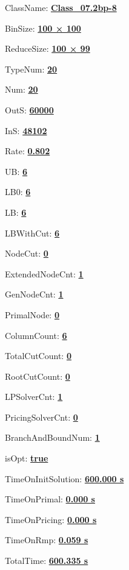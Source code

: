 \documentclass[11pt]{article}
\begin{document}
\pagestyle{empty}


ClassName: \underline{\textbf{Class_07.2bp-8}}
\par
BinSize: \underline{\textbf{100 × 100}}
\par
ReduceSize: \underline{\textbf{100 × 99}}
\par
TypeNum: \underline{\textbf{20}}
\par
Num: \underline{\textbf{20}}
\par
OutS: \underline{\textbf{60000}}
\par
InS: \underline{\textbf{48102}}
\par
Rate: \underline{\textbf{0.802}}
\par
UB: \underline{\textbf{6}}
\par
LB0: \underline{\textbf{6}}
\par
LB: \underline{\textbf{6}}
\par
LBWithCut: \underline{\textbf{6}}
\par
NodeCut: \underline{\textbf{0}}
\par
ExtendedNodeCnt: \underline{\textbf{1}}
\par
GenNodeCnt: \underline{\textbf{1}}
\par
PrimalNode: \underline{\textbf{0}}
\par
ColumnCount: \underline{\textbf{6}}
\par
TotalCutCount: \underline{\textbf{0}}
\par
RootCutCount: \underline{\textbf{0}}
\par
LPSolverCnt: \underline{\textbf{1}}
\par
PricingSolverCnt: \underline{\textbf{0}}
\par
BranchAndBoundNum: \underline{\textbf{1}}
\par
isOpt: \underline{\textbf{true}}
\par
TimeOnInitSolution: \underline{\textbf{600.000 s}}
\par
TimeOnPrimal: \underline{\textbf{0.000 s}}
\par
TimeOnPricing: \underline{\textbf{0.000 s}}
\par
TimeOnRmp: \underline{\textbf{0.059 s}}
\par
TotalTime: \underline{\textbf{600.335 s}}
\par
\newpage


\end{document}
